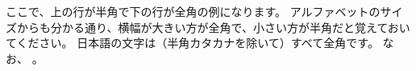 \documentclass[text01.tex]{subfiles}
\begin{document}
ここで、上の行が半角で下の行が全角の例になります。
アルファベットのサイズからも分かる通り、横幅が大きい方が全角で、小さい方が半角だと覚えておいてください。
日本語の文字は（半角カタカナを除いて）すべて全角です。
なお、
\textbf{\color{red}{プログラミングでアルファベットや記号を入力するときは、必ず半角文字(小さい文字)を使いましょう}}。







\end{document}
